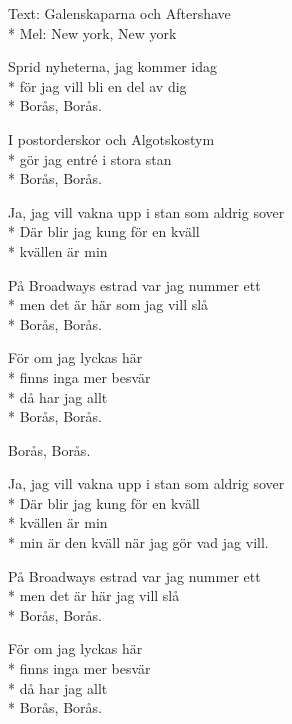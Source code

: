 \begin{SongText}
\begin{SongInfo}
    Text: Galenskaparna och Aftershave\\*%
    Mel: New york, New york
\end{SongInfo}
\begin{SongVerse}
Sprid nyheterna, jag kommer idag\\*%
för jag vill bli en del av dig\\*%
Borås, Borås.
\end{SongVerse}
\begin{SongVerse}
I postorderskor och Algotskostym\\*%
gör jag entré i stora stan\\*%
Borås, Borås.
\end{SongVerse}
\begin{SongVerse}
Ja, jag vill vakna upp i stan som aldrig sover\\*%
Där blir jag kung för en kväll\\*%
kvällen är min
\end{SongVerse}
\begin{SongVerse}
På Broadways estrad var jag nummer ett\\*%
men det är här som jag vill slå\\*%
Borås, Borås.
\end{SongVerse}
\begin{SongVerse}
För om jag lyckas här\\*%
finns inga mer besvär\\*%
då har jag allt\\*%
Borås, Borås.
\end{SongVerse}
\begin{SongVerse}
Borås, Borås. 
\end{SongVerse}
\begin{SongVerse}
Ja, jag vill vakna upp i stan som aldrig sover\\*%
Där blir jag kung för en kväll\\*%
kvällen är min\\*%
min är den kväll när jag gör vad jag vill.
\end{SongVerse}
\begin{SongVerse}
På Broadways estrad var jag nummer ett\\*%
men det är här jag vill slå\\*%
Borås, Borås.
\end{SongVerse}
\begin{SongVerse}
För om jag lyckas här\\*%
finns inga mer besvär\\*%
då har jag allt\\*%
Borås, Borås. 
\end{SongVerse}
\end{SongText}
